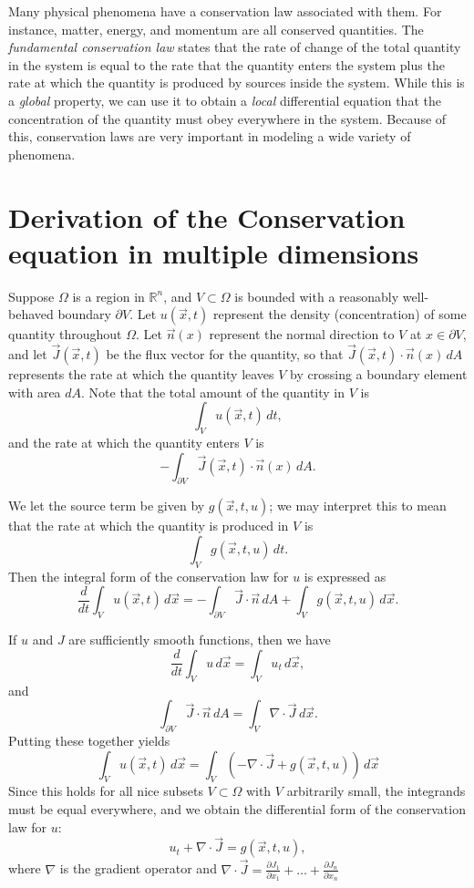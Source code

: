 \label{lab:HeatFlow}

Many physical phenomena have a conservation law associated with them.
For instance, matter, energy, and momentum are all conserved quantities.
The \textit{fundamental conservation law} states that the rate of change of the total quantity in the system is equal to the rate that the quantity enters the system plus the rate at which the quantity is produced by sources inside the system.
While this is a \textit{global} property, we can use it to obtain a \textit{local} differential equation that the concentration of the quantity must obey everywhere in the system.
Because of this, conservation laws are very important in modeling a wide variety of phenomena.

\section*{Derivation of the Conservation equation in multiple dimensions}
Suppose $\Omega$ is a region in $\mathbb{R}^n$, and $V \subset \Omega$ is bounded with a reasonably well-behaved boundary $\partial V$.
Let $u(\vec{x},t)$ represent the density (concentration) of some quantity throughout $\Omega$.
Let $\vec{n}(x)$ represent the normal direction to $V$ at $x \in \partial V$, and let $\vec{J}(\vec{x},t)$ be the flux vector for the quantity, so that $\vec{J}(\vec{x},t) \cdot \vec{n}(x) \, dA$ represents the rate at which the quantity leaves $V$ by crossing a boundary element with area $dA$.
Note that the total amount of the quantity in $V$ is
\[ \int_V u(\vec{x},t)\, dt,\]
and the rate at which the quantity enters $V$ is
\[-\int_{\partial V} \vec{J}(\vec{x},t) \cdot \vec{n}(x) \, dA.\]

We let the source term be given by $g(\vec{x},t,u)$; we may interpret this to mean that the rate at which the quantity is produced in $V$ is
\[\int_V g(\vec{x},t,u)\, dt.\]
Then the integral form of the conservation law for $u$ is expressed as
\[\frac{d}{dt} \int_V u(\vec{x},t) \, d\vec{x} = -\int_{\partial V} \vec{J}\cdot \vec{n}\, dA + \int_V g(\vec{x},t,u)\, d\vec{x}.\]

If $u$ and $J$ are sufficiently smooth functions, then we have
\[ \frac{d}{dt} \int_V u\, d\vec{x} = \int_V u_t \, d\vec{x},\]
and
\[ \int_{\partial V} \vec{J}\cdot \vec{n}\, dA = \int_V \nabla \cdot \vec{J}\, d\vec{x} .\]
Putting these together yields
\[
\int_Vu(\vec x,t)\,d\vec x = \int_V\left(
-\nabla\cdot \vec{J} + g(\vec{x},t,u)
\right)\,d\vec x
\]
Since this holds for all nice subsets $V \subset \Omega$ with $V$ arbitrarily small, the integrands must be equal everywhere, and we obtain the differential form of the conservation law for $u$:
\[ u_t + \nabla \cdot \vec{J} = g(\vec{x},t,u) ,\]
where $\nabla$ is the gradient operator and $\nabla \cdot \vec{J} = \frac{\partial J_1}{\partial x_1} + \dots + \frac{\partial J_n}{\partial x_n}$

